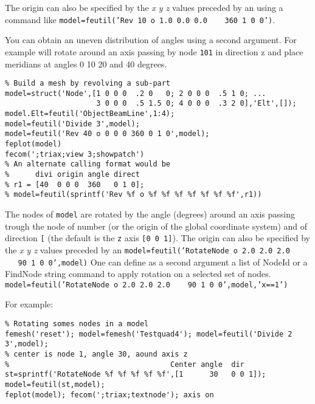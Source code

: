 The origin can also be specified by the {\sl x y z }values preceded by an  using a command like {\tt model=feutil('Rev 10 o 1.0 0.0 0.0 \ \ \ 360 1 0 0')}.

You can obtain an uneven distribution of angles using a second argument. For example  will rotate around an axis passing by node {\tt 101} in direction {\ti z} and place meridians at angles 0 10 20 and 40 degrees. 

\begin{verbatim}
% Build a mesh by revolving a sub-part
model=struct('Node',[1 0 0 0  .2 0   0; 2 0 0 0  .5 1 0; ...  
                     3 0 0 0  .5 1.5 0; 4 0 0 0  .3 2 0],'Elt',[]);
model.Elt=feutil('ObjectBeamLine',1:4);
model=feutil('Divide 3',model);
model=feutil('Rev 40 o 0 0 0 360 0 1 0',model);
feplot(model)
fecom(';triax;view 3;showpatch')
% An alternate calling format would be
%      divi origin angle direct
% r1 = [40  0 0 0  360   0 1 0];
% model=feutil(sprintf('Rev %f o %f %f %f %f %f %f %f',r1))
\end{verbatim}%




 The nodes of {\tt model} are rotated by the angle  (degrees) around an axis passing trough the node of number  (or the origin of the global coordinate system) and of direction {\tt [}\tsi{nx ny nz}{\tt ]} (the default is the {\tt z} axis {\tt [0 0 1]}). The origin can also be specified by the {\sl x y z} values preceded by an 
{\tt model=feutil('RotateNode o 2.0 2.0 2.0 \ \ \  90  1 0 0',model)}
One can define as a second argument a list of NodeId or a FindNode string command to apply rotation on a selected set of nodes.
{\tt model=feutil('RotateNode o 2.0 2.0 2.0 \ \ \  90  1 0 0',model,'x==1')}

For example:

\begin{verbatim}
% Rotating somes nodes in a model
femesh('reset'); model=femesh('Testquad4'); model=feutil('Divide 2 3',model); 
% center is node 1, angle 30, aound axis z
%                                     Center angle  dir
st=sprintf('RotateNode %f %f %f %f %f',[1      30   0 0 1]);
model=feutil(st,model);  
feplot(model); fecom(';triax;textnode'); axis on
\end{verbatim}%

